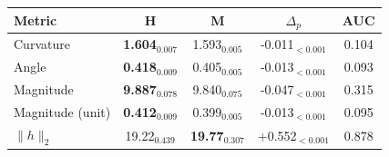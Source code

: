 \begin{tabular}{lcccc}
\toprule
\textbf{Metric} & \textbf{H} & \textbf{M} & \textbf{$\Delta_p$} & \textbf{AUC} \\
\midrule
Curvature & \textbf{1.604}$_{0.007}$ & 1.593$_{0.005}$ & -0.011$_{<0.001}$ & 0.104 \\
Angle & \textbf{0.418}$_{0.009}$ & 0.405$_{0.005}$ & -0.013$_{<0.001}$ & 0.093 \\
Magnitude & \textbf{9.887}$_{0.078}$ & 9.840$_{0.075}$ & -0.047$_{<0.001}$ & 0.315 \\
Magnitude (unit) & \textbf{0.412}$_{0.009}$ & 0.399$_{0.005}$ & -0.013$_{<0.001}$ & 0.095 \\
$\|h\|_2$ & 19.22$_{0.439}$ & \textbf{19.77}$_{0.307}$ & +0.552$_{<0.001}$ & 0.878 \\
\bottomrule
\end{tabular}
